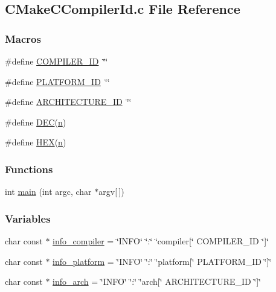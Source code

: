 \hypertarget{a00097}{}\subsection{C\+Make\+C\+Compiler\+Id.\+c File Reference}
\label{a00097}
\subsubsection*{Macros}
\begin{DoxyCompactItemize}
\item 
\#define \hyperlink{a00097_a81dee0709ded976b2e0319239f72d174}{C\+O\+M\+P\+I\+L\+E\+R\+\_\+\+I\+D}~\char`\"{}\char`\"{}
\item 
\#define \hyperlink{a00097_adbc5372f40838899018fadbc89bd588b}{P\+L\+A\+T\+F\+O\+R\+M\+\_\+\+I\+D}~\char`\"{}\char`\"{}
\item 
\#define \hyperlink{a00097_aba35d0d200deaeb06aee95ca297acb28}{A\+R\+C\+H\+I\+T\+E\+C\+T\+U\+R\+E\+\_\+\+I\+D}~\char`\"{}\char`\"{}
\item 
\#define \hyperlink{a00097_ad1280362da42492bbc11aa78cbf776ad}{D\+E\+C}(\hyperlink{a00107_ae4e1b71ca84b7ff488e42aa1b6b485ce}{n})
\item 
\#define \hyperlink{a00097_a46d5d95daa1bef867bd0179594310ed5}{H\+E\+X}(\hyperlink{a00107_ae4e1b71ca84b7ff488e42aa1b6b485ce}{n})
\end{DoxyCompactItemize}
\subsubsection*{Functions}
\begin{DoxyCompactItemize}
\item 
int \hyperlink{a00097_a0ddf1224851353fc92bfbff6f499fa97}{main} (int argc, char $\ast$argv\mbox{[}$\,$\mbox{]})
\end{DoxyCompactItemize}
\subsubsection*{Variables}
\begin{DoxyCompactItemize}
\item 
char const $\ast$ \hyperlink{a00097_a4b0efeb7a5d59313986b3a0390f050f6}{info\+\_\+compiler} = \char`\"{}I\+N\+F\+O\char`\"{} \char`\"{}\+:\char`\"{} \char`\"{}compiler\mbox{[}\char`\"{} C\+O\+M\+P\+I\+L\+E\+R\+\_\+\+I\+D \char`\"{}\mbox{]}\char`\"{}
\item 
char const $\ast$ \hyperlink{a00097_a2321403dee54ee23f0c2fa849c60f7d4}{info\+\_\+platform} = \char`\"{}I\+N\+F\+O\char`\"{} \char`\"{}\+:\char`\"{} \char`\"{}platform\mbox{[}\char`\"{} P\+L\+A\+T\+F\+O\+R\+M\+\_\+\+I\+D \char`\"{}\mbox{]}\char`\"{}
\item 
char const $\ast$ \hyperlink{a00097_a59647e99d304ed33b15cb284c27ed391}{info\+\_\+arch} = \char`\"{}I\+N\+F\+O\char`\"{} \char`\"{}\+:\char`\"{} \char`\"{}arch\mbox{[}\char`\"{} A\+R\+C\+H\+I\+T\+E\+C\+T\+U\+R\+E\+\_\+\+I\+D \char`\"{}\mbox{]}\char`\"{}
\end{DoxyCompactItemize}


